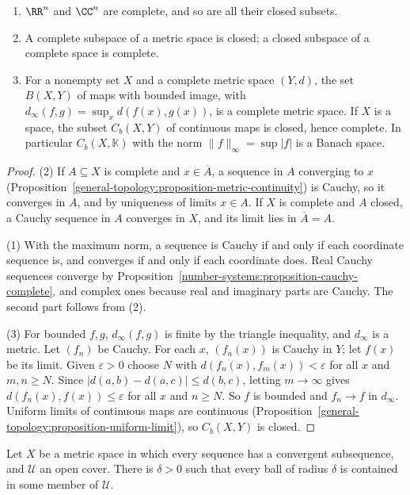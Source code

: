 \begin{proposition}\label{general-topology:proposition-complete-examples}
\begin{enumerate}
\item $\RR^n$ and $\CC^n$ are complete, and so are all their closed subsets.
\item A complete subspace of a metric space is closed; a closed subspace of a complete space is complete.
\item For a nonempty set $X$ and a complete metric space $(Y, d)$, the set $B(X, Y)$ of maps with bounded image, with
$d_\infty(f, g) = \sup_x d(f(x), g(x))$, is a complete metric space. If $X$ is a space, the subset $C_b(X, Y)$ of continuous maps is closed, hence complete.
In particular $C_b(X, \mathbb{K})$ with the norm $\|f\|_\infty = \sup |f|$ is a Banach space.
\end{enumerate}
\end{proposition}

\begin{proof}
(2) If $A \subseteq X$ is complete and $x \in \overline{A}$, a sequence in $A$ converging to $x$ (Proposition~\ref{general-topology:proposition-metric-continuity})
is Cauchy, so it converges in $A$, and by uniqueness of limits $x \in A$. If $X$ is complete and $A$ closed, a Cauchy sequence in $A$ converges in $X$, and its
limit lies in $\overline{A} = A$.

(1) With the maximum norm, a sequence is Cauchy if and only if each coordinate sequence is, and converges if and only if each coordinate does. Real
Cauchy sequences converge by Proposition~\ref{number-systems:proposition-cauchy-complete}, and complex ones because real and imaginary parts are
Cauchy. The second part follows from (2).

(3) For bounded $f, g$, $d_\infty(f, g)$ is finite by the triangle inequality, and $d_\infty$ is a metric. Let $(f_n)$ be Cauchy. For each $x$, $(f_n(x))$ is
Cauchy in $Y$; let $f(x)$ be its limit. Given $\varepsilon > 0$ choose $N$ with $d(f_n(x), f_m(x)) < \varepsilon$ for all $x$ and $m, n \geq N$. Since
$|d(a, b) - d(a, c)| \leq d(b, c)$, letting $m \to \infty$ gives $d(f_n(x), f(x)) \leq \varepsilon$ for all $x$ and $n \geq N$. So $f$ is bounded and
$f_n \to f$ in $d_\infty$. Uniform limits of continuous maps are continuous (Proposition~\ref{general-topology:proposition-uniform-limit}), so $C_b(X, Y)$ is
closed.
\end{proof}

\begin{lemma}\label{general-topology:lemma-lebesgue-number}
Let $X$ be a metric space in which every sequence has a convergent subsequence, and $\mathcal{U}$ an open cover. There is $\delta > 0$ such that every
ball of radius $\delta$ is contained in some member of $\mathcal{U}$.
\end{lemma}

